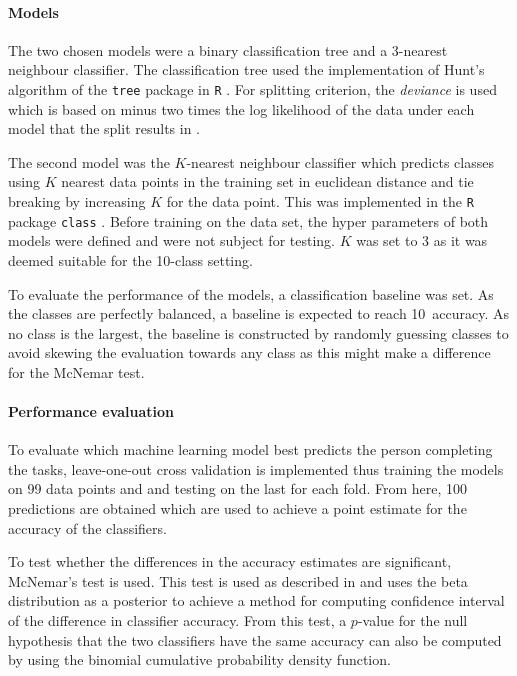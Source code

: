 \documentclass[11pt,fleqn]{article}
\begin{document}
\paragraph{Models} The two chosen models were a binary classification tree and a 3-nearest neighbour classifier. The classification tree used the implementation of Hunt's algorithm of the \texttt{tree} package in \texttt{R} \cite{Tree}. For splitting criterion, the \textit{deviance} is used which is based on minus two times the log likelihood of the data under each model that the split results in \cite{Deviance}.

The second model was the \(K\)-nearest neighbour classifier which predicts classes using \(K\) nearest data points in the training set in euclidean distance and tie breaking by increasing \(K\) for the data point. This was implemented in the \texttt{R} package \texttt{class} \cite{KNN}. Before training on the data set, the hyper parameters of both models were defined and were not subject for testing. \(K\) was set to 3 as it was deemed suitable for the 10-class setting.

To evaluate the performance of the models, a classification baseline was set. As the classes are perfectly balanced, a baseline is expected to reach 10\pro\ accuracy. As no class is the largest, the baseline is constructed by randomly guessing classes to avoid skewing the evaluation towards any class as this might make a difference for the McNemar test.


\paragraph{Performance evaluation}
To evaluate which machine learning model best predicts the person completing the tasks, leave-one-out cross validation is implemented thus training the models on 99 data points and and testing on the last for each fold.
From here, 100 predictions are obtained which are used to achieve a point estimate for the accuracy of the classifiers.

To test whether the differences in the accuracy estimates are significant, McNemar's test is used. 
This test is used as described in \cite[Method 11.3.2]{Tue} and uses the beta distribution as a posterior to achieve a method for computing confidence interval of the difference in classifier accuracy.
From this test, a \(p\)-value for the null hypothesis that the two classifiers have the same accuracy can also be computed by using the binomial cumulative probability density function.
\end{document}
